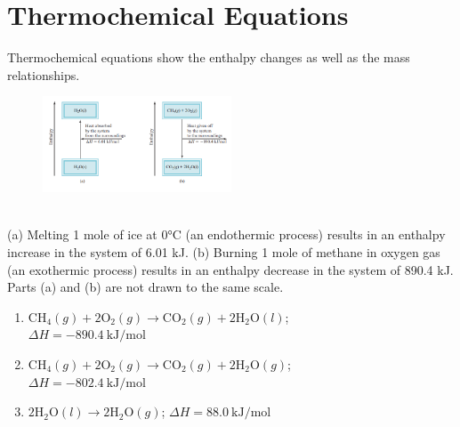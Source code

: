 \documentclass[a4paper,12pt,twocolumn]{article}
\begin{document}
\section{Thermochemical Equations}
Thermochemical equations show the enthalpy changes as well as the mass relationships. 
\begin{figure}[h]
\centering
\includegraphics[width=0.5\textwidth]{Screenshot 2023-03-27 012722.png}
\end{figure}\\
(a) Melting 1 mole of ice at 0°C (an endothermic process) results in an enthalpy
increase in the system of 6.01 kJ. (b) Burning 1 mole of methane
in oxygen gas (an exothermic process) results in an enthalpy
decrease in the system of 890.4 kJ. Parts (a) and (b) are not drawn to
the same scale.\\ 
\begin{enumerate}
\item $\mathrm{CH}_{4}(g)+2 \mathrm{O}_{2}(g) \longrightarrow \mathrm{CO}_{2}(g)+2 \mathrm{H}_{2} \mathrm{O}(l)$;\\
$\Delta H=-890.4 \mathrm{~kJ} / \mathrm{mol}$
\item $\mathrm{CH}_{4}(g)+2 \mathrm{O}_{2}(g) \longrightarrow \mathrm{CO}_{2}(g)+2 \mathrm{H}_{2} \mathrm{O}(g)$;\\
$\Delta H=-802.4 \mathrm{~kJ} / \mathrm{mol}$
\item
$2 \mathrm{H}_{2} \mathrm{O}(l) \longrightarrow 2 \mathrm{H}_{2} \mathrm{O}(g)$;
$\Delta H=88.0 \mathrm{~kJ} / \mathrm{mol}$

\end{enumerate}
\end{document}

